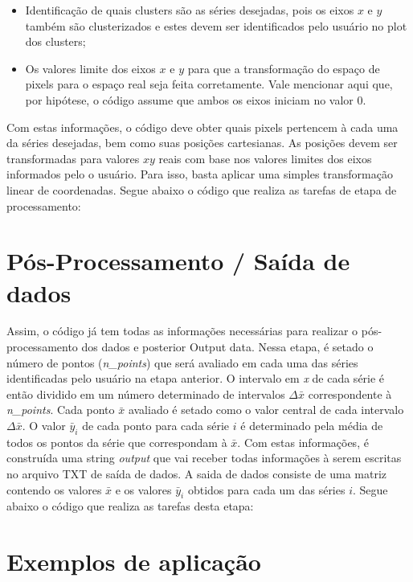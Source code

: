 \documentclass{article}
\begin{document}
    \begin{itemize}
        \item Identificação de quais clusters são as séries desejadas, pois os eixos $x$ e $y$ também são clusterizados e estes devem ser identificados pelo usuário no plot dos clusters;
        \item Os valores limite dos eixos $x$ e $y$ para que a transformação do espaço de pixels para o espaço real seja feita corretamente. Vale mencionar aqui que, por hipótese, o código assume que ambos os eixos iniciam no valor $0$.
    \end{itemize}
    
    Com estas informações, o código deve obter quais pixels pertencem à cada uma da séries desejadas, bem como suas posições cartesianas. As posições devem ser transformadas para valores $xy$ reais com base nos valores limites dos eixos informados pelo o usuário. Para isso, basta aplicar uma simples transformação linear de coordenadas.
    Segue abaixo o código que realiza as tarefas de etapa de processamento:
    
    
    \section{Pós-Processamento / Saída de dados}
    
    Assim, o código já tem todas as informações necessárias para realizar o pós-processamento dos dados e posterior Output data. 
    Nessa etapa, é setado o número de pontos (\textit{n\_points}) que será avaliado em cada uma das séries identificadas pelo usuário na etapa anterior. O intervalo em \textit{x} de cada série é então dividido em um número determinado de intervalos $\Delta \bar{x}$ correspondente à \textit{n\_points}. Cada ponto $\bar{x}$ avaliado é setado como o valor central de cada intervalo $\Delta \bar{x}$. O valor $\bar{y}_i$ de cada ponto para cada série $i$ é determinado pela média de todos os pontos da série que correspondam à $\bar{x}$. 
    Com estas informações, é construída uma string \textit{output} que vai receber todas informações à serem escritas no arquivo TXT de saída de dados. A saida de dados consiste de uma matriz contendo os valores $\bar{x}$ e os valores $\bar{y}_i$ obtidos para cada um das séries $i$.
    Segue abaixo o código que realiza as tarefas desta etapa:
      

    \section{Exemplos de aplicação}    
\end{document}
